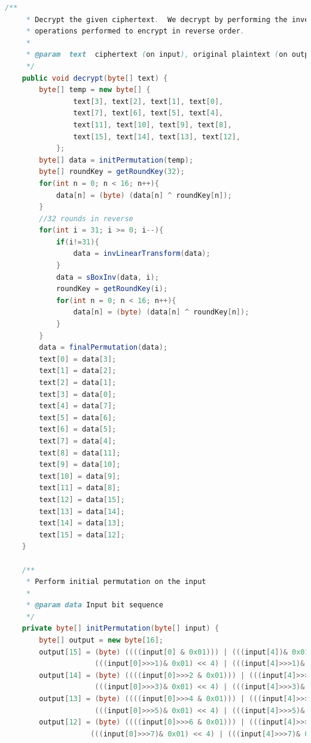 \documentclass[12pt]{article} %
\begin{document}
\begin{lstlisting}[language=Java, basicstyle=\small, breaklines=true]
    /**
     * Decrypt the given ciphertext.  We decrypt by performing the inverse
     * operations performed to encrypt in reverse order.
     *
     * @param  text  ciphertext (on input), original plaintext (on output).
     */
    public void decrypt(byte[] text) {
        byte[] temp = new byte[] {
                text[3], text[2], text[1], text[0],
                text[7], text[6], text[5], text[4],
                text[11], text[10], text[9], text[8],
                text[15], text[14], text[13], text[12],
            };
        byte[] data = initPermutation(temp);
        byte[] roundKey = getRoundKey(32);
        for(int n = 0; n < 16; n++){
            data[n] = (byte) (data[n] ^ roundKey[n]);
        }
        //32 rounds in reverse
        for(int i = 31; i >= 0; i--){
            if(i!=31){
                data = invLinearTransform(data);
            }
            data = sBoxInv(data, i);
            roundKey = getRoundKey(i);
            for(int n = 0; n < 16; n++){
                data[n] = (byte) (data[n] ^ roundKey[n]);
            }
        }
        data = finalPermutation(data);   
        text[0] = data[3];
        text[1] = data[2];
        text[2] = data[1];
        text[3] = data[0];
        text[4] = data[7];
        text[5] = data[6];
        text[6] = data[5];
        text[7] = data[4];
        text[8] = data[11];
        text[9] = data[10];
        text[10] = data[9];
        text[11] = data[8];
        text[12] = data[15];
        text[13] = data[14];
        text[14] = data[13];
        text[15] = data[12];
    }

    /**
     * Perform initial permutation on the input
     *
     * @param data Input bit sequence
     */
    private byte[] initPermutation(byte[] input) {
        byte[] output = new byte[16];
        output[15] = (byte) ((((input[0] & 0x01))) | (((input[4])& 0x01) << 1) | (((input[8])& 0x01) << 2) | (((input[12])& 0x01) << 3) | 
                     (((input[0]>>>1)& 0x01) << 4) | (((input[4]>>>1)& 0x01) << 5) | (((input[8]>>>1)& 0x01) << 6) | (((input[12]>>>1)& 0x01) << 7));
        output[14] = (byte) ((((input[0]>>>2 & 0x01))) | (((input[4]>>>2)& 0x01) << 1) | (((input[8]>>>2)& 0x01) << 2) | (((input[12]>>>2)& 0x01) << 3) | 
                     (((input[0]>>>3)& 0x01) << 4) | (((input[4]>>>3)& 0x01) << 5) | (((input[8]>>>3)& 0x01) << 6) | (((input[12]>>>3)& 0x01) << 7));
        output[13] = (byte) ((((input[0]>>>4 & 0x01))) | (((input[4]>>>4)& 0x01) << 1) | (((input[8]>>>4)& 0x01) << 2) | (((input[12]>>>4)& 0x01) << 3) | 
                     (((input[0]>>>5)& 0x01) << 4) | (((input[4]>>>5)& 0x01) << 5) | (((input[8]>>>5)& 0x01) << 6) | (((input[12]>>>5)& 0x01) << 7));
        output[12] = (byte) ((((input[0]>>>6 & 0x01))) | (((input[4]>>>6)& 0x01) << 1) | (((input[8]>>>6)& 0x01) << 2) | (((input[12]>>>6)& 0x01) << 3) | 
                    (((input[0]>>>7)& 0x01) << 4) | (((input[4]>>>7)& 0x01) << 5) | (((input[8]>>>7)& 0x01) << 6) | (((input[12]>>>7)& 0x01) << 7));
        

\end{lstlisting}
\end{document}
